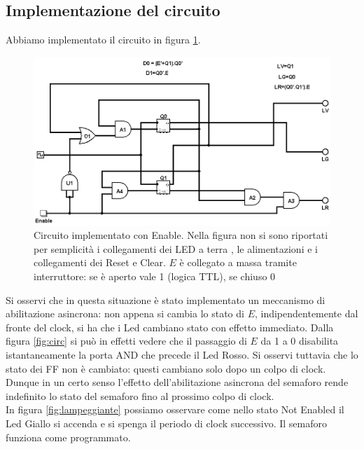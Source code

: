 \documentclass[10pt,a4paper]{article}
\begin{document}
\subsection{Implementazione del circuito}
Abbiamo implementato il circuito in figura \ref{fig:circcomplete}.
\begin{figure}[!htb]
\centering
\includegraphics[scale=0.5]{circcomplete.png}
\caption{Circuito implementato con Enable. Nella figura non si sono riportati per semplicità i collegamenti dei LED a terra , le alimentazioni e i collegamenti dei Reset e Clear. $E$ è collegato a massa tramite interruttore: se è aperto vale 1 (logica TTL), se chiuso 0\label{fig:circcomplete}}
\end{figure}
Si osservi che in questa situazione è stato implementato un meccanismo di abilitazione asincrona: non appena si cambia lo stato di $E$, indipendentemente dal fronte del clock, si ha che i Led cambiano stato con effetto immediato. Dalla figura \ref{fig:circ} si può in effetti vedere che il passaggio di $E$ da 1 a 0 disabilita istantaneamente la porta AND che precede il Led Rosso. Si osservi tuttavia che lo stato dei FF non è cambiato: questi cambiano solo dopo un colpo di clock. Dunque in un certo senso l'effetto dell'abilitazione asincrona del semaforo rende indefinito lo stato del semaforo fino al prossimo colpo di clock.\\
In figura \ref{fig:lampeggiante} possiamo osservare come nello stato Not Enabled il Led Giallo si accenda e si spenga il periodo di clock successivo. Il semaforo funziona come programmato.
\end{document}
